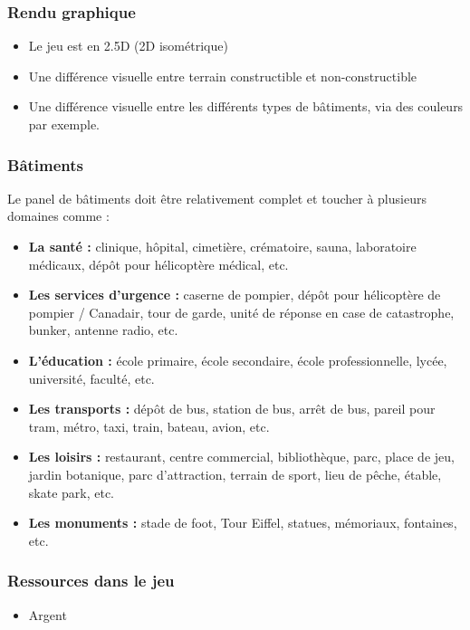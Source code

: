 \documentclass[a4paper,10pt,openany,oneside]{report}
\begin{document}
\subsubsection{Rendu graphique}
\begin{itemize}
\item Le jeu est en 2.5D (2D isométrique)
\item Une différence visuelle entre terrain constructible et non-constructible
\item Une différence visuelle entre les différents types de bâtiments, via des couleurs par exemple.
\end{itemize}

\subsubsection{Bâtiments}
Le panel de bâtiments doit être relativement complet et toucher à plusieurs domaines comme :
\begin{itemize}
\item \textbf{La santé : }clinique, hôpital, cimetière, crématoire, sauna, laboratoire médicaux, dépôt pour hélicoptère médical, etc.
\item \textbf{Les services d'urgence : }caserne de pompier, dépôt pour hélicoptère de pompier / Canadair, tour de garde, unité de réponse en case de catastrophe, bunker, antenne radio, etc.
\item \textbf{L'éducation : }école primaire, école secondaire, école professionnelle, lycée, université, faculté, etc.
\item \textbf{Les transports : }dépôt de bus, station de bus, arrêt de bus, pareil pour tram, métro, taxi, train, bateau, avion, etc.
\item \textbf{Les loisirs : }restaurant, centre commercial, bibliothèque, parc, place de jeu, jardin botanique, parc d'attraction, terrain de sport, lieu de pêche, étable, skate park, etc.
\item \textbf{Les monuments : }stade de foot, Tour Eiffel, statues, mémoriaux, fontaines, etc.
\end{itemize}

\subsubsection{Ressources dans le jeu}
\begin{itemize}
\item Argent
\end{itemize}
\end{document}
